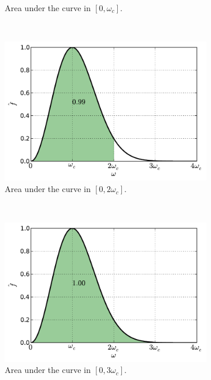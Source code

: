 \documentclass[12pt,letterpaper]{article}
\begin{document}
{\begin{figure}[H]
\begin{subfigure}[b]{0.45\textwidth}
        \caption{Area under the curve in $[0,\omega_c]$.}
    \end{subfigure}\
    \begin{subfigure}[b]{0.45\textwidth}
        \includegraphics[width=\textwidth]{img/ricker_area=2.pdf}
        \caption{Area under the curve in $[0,2\omega_c]$.}
    \end{subfigure}\\
    \begin{subfigure}[b]{0.45\textwidth}
        \includegraphics[width=\textwidth]{img/ricker_area=3.pdf}
        \caption{Area under the curve in $[0,3\omega_c]$.}
    \end{subfigure}
    \begin{subfigure}[b]{0.45\textwidth}

\end{subfigure}
\end{figure}}
\end{document}
